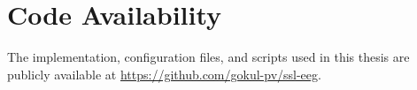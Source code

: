 \FloatBarrier

\section{Code Availability}\label{app:code}

The implementation, configuration files, and scripts used in this thesis are
publicly available at \url{https://github.com/gokul-pv/ssl-eeg}.

